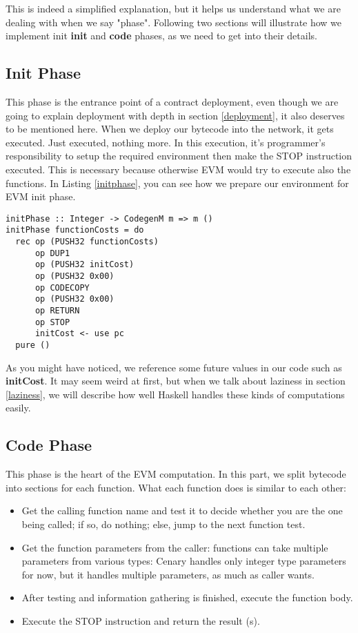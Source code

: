 \documentclass{article}
\begin{document}
This is indeed a simplified explanation, but it helps us understand what we are dealing with when we say "phase".
Following two sections will illustrate how we implement init \textbf{init} and \textbf{code} phases, as we need to get into their details.
\subsection{Init Phase}
This phase is the entrance point of a contract deployment, even though we are going to explain deployment with depth in section \ref{deployment}, it also deserves to be mentioned here. When we deploy our bytecode into the network, it gets executed. Just executed, nothing more. In this execution, it's programmer's responsibility to setup the required environment then make the STOP instruction executed. This is necessary because otherwise EVM would try to execute also the functions. In Listing \ref{initphase}, you can see how we prepare our environment for EVM init phase. \\
\begin{lstlisting}[label=initphase,caption=Init Phase]
initPhase :: Integer -> CodegenM m => m ()
initPhase functionCosts = do
  rec op (PUSH32 functionCosts)
      op DUP1
      op (PUSH32 initCost)
      op (PUSH32 0x00)
      op CODECOPY
      op (PUSH32 0x00)
      op RETURN
      op STOP
      initCost <- use pc
  pure ()
\end{lstlisting}
As you might have noticed, we reference some future values in our code such as \textbf{initCost}. It may seem weird at first, but when we talk about laziness in section \ref{laziness}, we will describe how well Haskell handles these kinds of computations easily.
\subsection{Code Phase}
\label{subsec:code_phase}
This phase is the heart of the EVM computation. In this part, we split bytecode into sections for each function. What each function does is similar to each other:
\begin{itemize}
  \item Get the calling function name and test it to decide whether you are the one being called; if so, do nothing; else, jump to the next function test.
  \item Get the function parameters from the caller: functions can take multiple parameters from various types: Cenary handles only integer type parameters for now, but it handles multiple parameters, as much as caller wants.
  \item After testing and information gathering is finished, execute the function body.
  \item Execute the STOP instruction and return the result (s).
\end{itemize}
\end{document}
